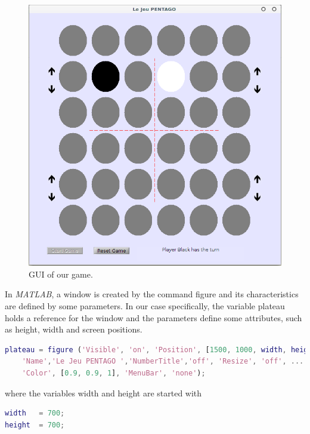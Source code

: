 \begin{figure}[h]
\centering
\includegraphics[scale=.35]{images/gui_jeu}
\caption{GUI of our game.}
\label{fig:gui}
\end{figure}

\FloatBarrier

In \textit{MATLAB}, a window is created by the command figure and its
characteristics are defined by some parameters. In our case specifically, the variable plateau
holds a reference for the window and the parameters define some attributes,
such as height, width and screen positions.

\begin{lstlisting}[language=Matlab]
% It creates a new figure which is going to host all the components
plateau = figure ('Visible', 'on', 'Position', [1500, 1000, width, height], ...
    'Name','Le Jeu PENTAGO ','NumberTitle','off', 'Resize', 'off', ...
    'Color', [0.9, 0.9, 1], 'MenuBar', 'none');
\end{lstlisting}

where the variables width and height are started with

\begin{lstlisting}[language=Matlab]
% Board's characteristics
width   = 700;
height  = 700;
\end{lstlisting}

